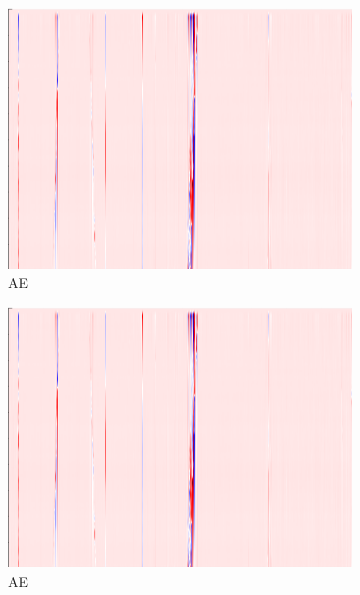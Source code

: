 \begin{figure}[!h]
    \begin{subfigure}{0.33\textwidth}
        \includegraphics[width=\textwidth]{figures/test.png}
        \caption{AE}
    \end{subfigure}%
    \hfill
    \begin{subfigure}{0.33\textwidth}
        \includegraphics[width=\textwidth]{figures/test.png}
        \caption{AE}
    \end{subfigure}%
    \hfill
    \begin{subfigure}{0.33\textwidth}

\end{subfigure}
\end{figure}
